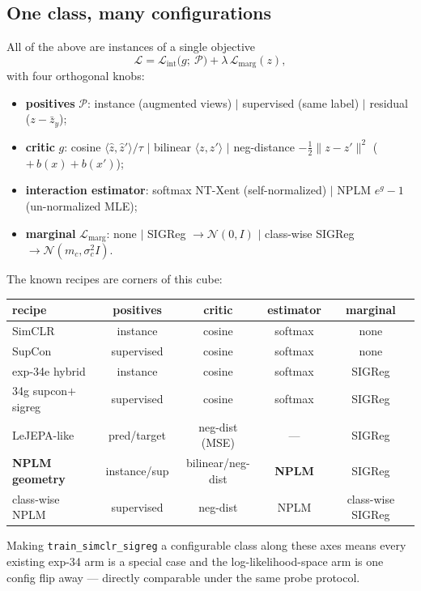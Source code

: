 \documentclass[11pt]{article}
\begin{document}
\subsection{One class, many configurations}
All of the above are instances of a single objective
\begin{equation}
\mathcal{L}
= \mathcal{L}_{\text{int}}\big(g;\ \mathcal{P}\big)
+ \lambda\,\mathcal{L}_{\text{marg}}(z),
\end{equation}
with four orthogonal knobs:
\begin{itemize}
\item \textbf{positives} $\mathcal{P}$: instance (augmented views) $\mid$
supervised (same label) $\mid$ residual ($z-\bar z_y$);
\item \textbf{critic} $g$: cosine $\langle\hat z,\hat z'\rangle/\tau$ $\mid$
bilinear $\langle z,z'\rangle$ $\mid$ neg-distance
$-\tfrac12\|z-z'\|^2$ ($+\,b(x)+b(x')$);
\item \textbf{interaction estimator}: softmax NT-Xent (self-normalized) $\mid$
NPLM $e^{g}-1$ (un-normalized MLE);
\item \textbf{marginal} $\mathcal{L}_{\text{marg}}$: none $\mid$
SIGReg $\to\mathcal{N}(0,I)$ $\mid$ class-wise SIGReg
$\to\mathcal{N}(m_c,\sigma_c^2 I)$.
\end{itemize}
The known recipes are corners of this cube:
\begin{center}
\begin{tabular}{@{}lcccc@{}}
\toprule
recipe & positives & critic & estimator & marginal\\
\midrule
SimCLR & instance & cosine & softmax & none\\
SupCon & supervised & cosine & softmax & none\\
exp-34e hybrid & instance & cosine & softmax & SIGReg\\
34g supcon$+$sigreg & supervised & cosine & softmax & SIGReg\\
LeJEPA-like & pred/target & neg-dist (MSE) & --- & SIGReg\\
\textbf{NPLM geometry} & instance/sup & bilinear/neg-dist & \textbf{NPLM} & SIGReg\\
class-wise NPLM & supervised & neg-dist & NPLM & class-wise SIGReg\\
\bottomrule
\end{tabular}
\end{center}
Making \texttt{train\_simclr\_sigreg} a configurable class along these axes means
every existing exp-34 arm is a special case and the log-likelihood-space arm is one
config flip away --- directly comparable under the same probe protocol.
\end{document}
